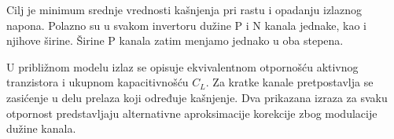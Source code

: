 Cilj je minimum srednje vrednosti kašnjenja pri rastu i opadanju izlaznog napona. Polazno su u svakom invertoru dužine P i N kanala jednake, kao i njihove širine. Širine P kanala zatim menjamo jednako u oba stepena.

U približnom modelu izlaz se opisuje ekvivalentnom otpornošću aktivnog tranzistora i ukupnom kapacitivnošću $C_L$. Za kratke kanale pretpostavlja se zasićenje u delu prelaza koji određuje kašnjenje. Dva prikazana izraza za svaku otpornost predstavljaju alternativne aproksimacije korekcije zbog modulacije dužine kanala.
